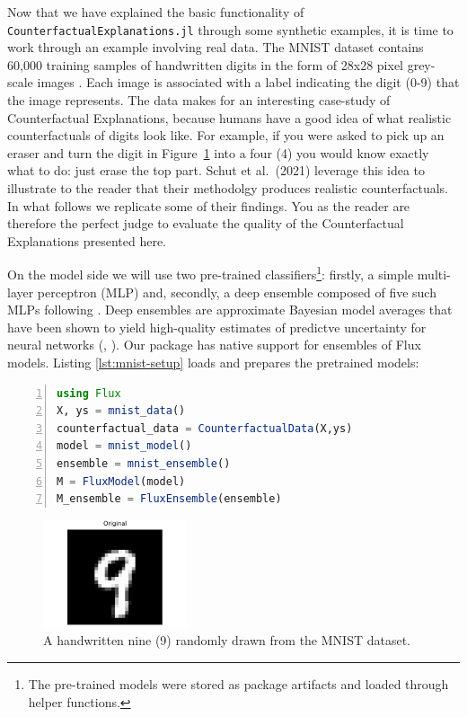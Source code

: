 \documentclass[
  letterpaper,
  DIV=11,
  numbers=noendperiod]{scrartcl}
\begin{document}
Now that we have explained the basic functionality of
\texttt{CounterfactualExplanations.jl} through some synthetic examples,
it is time to work through an example involving real data. The MNIST
dataset contains 60,000 training samples of handwritten digits in the
form of 28x28 pixel grey-scale images \cite{lecun1998mnist}. Each image
is associated with a label indicating the digit (0-9) that the image
represents. The data makes for an interesting case-study of
Counterfactual Explanations, because humans have a good idea of what
realistic counterfactuals of digits look like. For example, if you were
asked to pick up an eraser and turn the digit in
Figure~\ref{fig-mnist-orig} into a four (4) you would know exactly what
to do: just erase the top part. Schut et al.~(2021)
\cite{schut2021generating} leverage this idea to illustrate to the
reader that their methodolgy produces realistic counterfactuals. In what
follows we replicate some of their findings. You as the reader are
therefore the perfect judge to evaluate the quality of the
Counterfactual Explanations presented here.

On the model side we will use two pre-trained classifiers\footnote{The
  pre-trained models were stored as package artifacts and loaded through
  helper functions.}: firstly, a simple multi-layer perceptron (MLP)
and, secondly, a deep ensemble composed of five such MLPs following
\cite{schut2021generating}. Deep ensembles are approximate Bayesian
model averages that have been shown to yield high-quality estimates of
predictve uncertainty for neural networks (\cite{wilson2020case},
\cite{lakshminarayanan2016simple}). Our package has native support for
ensembles of Flux models. Listing \ref{lst:mnist-setup} loads and
prepares the pretrained models:

\begin{lstlisting}[language=Julia, escapechar=@, numbers=left, label={lst:mnist-setup}, caption={}]
using Flux
X, ys = mnist_data() 
counterfactual_data = CounterfactualData(X,ys)
model = mnist_model()
ensemble = mnist_ensemble()
M = FluxModel(model)
M_ensemble = FluxEnsemble(ensemble)
\end{lstlisting}

\begin{figure}

{\centering \includegraphics[width=1.66667in,height=1.25in]{www/mnist_original.png}

}

\caption{\label{fig-mnist-orig}A handwritten nine (9) randomly drawn
from the MNIST dataset.}

\end{figure}
\end{document}
